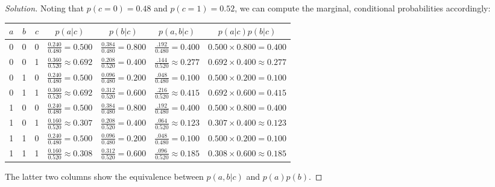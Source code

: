 \documentclass[11pt, oneside]{article}\usepackage[]{graphicx}\usepackage[]{color}
\newenvironment{solution}
  {\begin{proof}[Solution]}
  {\end{proof}}
\begin{document}
\begin{solution}
Noting that $p(c=0) = 0.48$ and $p(c=1) = 0.52$, we can compute the marginal, conditional probabilities accordingly:

\begin{table}[h!]
\centering
\begin{tabular}{ |c|c|c|c|c|c|c| }
\hline
$a$ & $b$ & $c$ & $p(a|c)$ & $p(b|c)$ & $p(a, b|c)$ & $p(a|c)p(b|c)$ \\
\hline
\rule{0pt}{3ex} 0 & 0 & 0 & $\frac{0.240}{0.480}=0.500$ & $\frac{0.384}{0.480}=0.800$ & $\frac{.192}{0.480} = 0.400$ & $0.500\times0.800= 0.400$ \\
\rule{0pt}{3ex} 0 & 0 & 1 & $\frac{0.360}{0.520}\approx0.692$ & $\frac{0.208}{0.520}=0.400$ & $\frac{.144}{0.520}\approx 0.277$ & $0.692\times0.400\approx0.277$ \\
\rule{0pt}{3ex} 0 & 1 & 0 & $\frac{0.240}{0.480} = 0.500$ & $\frac{0.096}{0.480} = 0.200$ & $\frac{.048}{0.480} = 0.100$ & $0.500\times0.200=0.100$ \\
\rule{0pt}{3ex} 0 & 1 & 1 & $\frac{0.360}{0.520} \approx 0.692$ & $\frac{0.312}{0.520} = 0.600$ & $\frac{.216}{0.520} \approx 0.415$ & $0.692\times0.600=0.415$ \\
\rule{0pt}{3ex} 1 & 0 & 0 & $\frac{0.240}{0.480} = 0.500$ & $\frac{0.384}{0.480} = 0.800$ & $\frac{.192}{0.480} = 0.400$ & $0.500\times0.800=0.400$ \\
\rule{0pt}{3ex} 1 & 0 & 1 & $\frac{0.160}{0.520} \approx 0.307$ & $\frac{0.208}{0.520} = 0.400$ & $\frac{.064}{0.520} \approx 0.123$ & $0.307\times0.400\approx0.123$ \\
\rule{0pt}{3ex} 1 & 1 & 0 & $\frac{0.240}{0.480} = 0.500$ & $\frac{0.096}{0.480} = 0.200$ & $\frac{.048}{0.480} = 0.100$ & $0.500\times0.200=0.100$ \\
\rule{0pt}{3ex} 1 & 1 & 1 & $\frac{0.160}{0.520} \approx 0.308$ & $\frac{0.312}{0.520} = 0.600$ & $\frac{.096}{0.520} \approx 0.185$ & $0.308\times0.600\approx0.185$ \\
\hline
\end{tabular}
\end{table}
  
The latter two columns show the equivalence between $p(a, b|c)$ and $p(a)p(b)$.



\end{solution}
\end{document}
